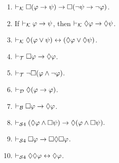 \documentclass[a4paper, 11pt]{article}                  %
\begin{document}
\begin{enumerate}
	\item $\vdash_{\mathcal{K}} \Box(\varphi\rightarrow \psi)\rightarrow\Box(\neg \psi\rightarrow \neg \varphi)$.

	\item If $\vdash_{\mathcal{K}} \varphi \rightarrow \psi$, then $\vdash_{\mathcal{K}} \Diamond\varphi \rightarrow \Diamond\psi$.

	\item $\vdash_{\mathcal{K}} \Diamond(\varphi \vee \psi)\leftrightarrow(\Diamond \varphi \vee \Diamond \psi)$.

	\item $\vdash_{\mathcal{T}} \Box\varphi\rightarrow\Diamond\varphi$.

	\item $\vdash_{\mathcal{T}} \neg\Box(\varphi\wedge \neg \varphi)$.

	\item $\vdash_{\mathcal{D}} \Diamond(\varphi \rightarrow \varphi)$.

	\item $\vdash_{\mathcal{B}} \Box\varphi\rightarrow\Diamond\varphi$.

	\item $\vdash_{\mathcal{S}4} (\Diamond \varphi\wedge\Box \psi)\rightarrow\Diamond(\varphi\wedge\Box \psi).$

	\item $\vdash_{\mathcal{S}4} \Box \varphi\rightarrow\Box\Diamond\Box \varphi$.

	\item $\vdash_{\mathcal{S}4} \Diamond\Diamond \varphi\leftrightarrow\Diamond \varphi$.


\end{enumerate}
\end{document}
